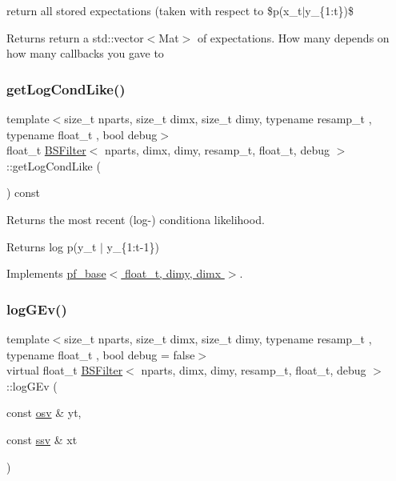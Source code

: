return all stored expectations (taken with respect to \$p(x\+\_\+t$\vert$y\+\_\+\{1\+:t\})\$ 

\begin{DoxyReturn}{Returns}
return a std\+::vector$<$\+Mat$>$ of expectations. How many depends on how many callbacks you gave to 
\end{DoxyReturn}
\mbox{\label{classBSFilter_a9cc91baeaaa2a22bff48d82157c86ec5}} 
\subsubsection{\texorpdfstring{get\+Log\+Cond\+Like()}{getLogCondLike()}}
{\footnotesize\ttfamily template$<$size\+\_\+t nparts, size\+\_\+t dimx, size\+\_\+t dimy, typename resamp\+\_\+t , typename float\+\_\+t , bool debug$>$ \\
float\+\_\+t \hyperlink{classBSFilter}{B\+S\+Filter}$<$ nparts, dimx, dimy, resamp\+\_\+t, float\+\_\+t, debug $>$\+::get\+Log\+Cond\+Like (\begin{DoxyParamCaption}{ }\end{DoxyParamCaption}) const\hspace{0.3cm}{\ttfamily [virtual]}}



Returns the most recent (log-\/) conditiona likelihood. 

\begin{DoxyReturn}{Returns}
log p(y\+\_\+t $\vert$ y\+\_\+\{1\+:t-\/1\}) 
\end{DoxyReturn}


Implements \hyperlink{classpf__base_a350df818820d6ab0fd6d413022b7f23b}{pf\+\_\+base$<$ float\+\_\+t, dimy, dimx $>$}.

\mbox{\label{classBSFilter_a1cf2ed5153756a015384d459e72a57de}} 
\subsubsection{\texorpdfstring{log\+G\+Ev()}{logGEv()}}
{\footnotesize\ttfamily template$<$size\+\_\+t nparts, size\+\_\+t dimx, size\+\_\+t dimy, typename resamp\+\_\+t , typename float\+\_\+t , bool debug = false$>$ \\
virtual float\+\_\+t \hyperlink{classBSFilter}{B\+S\+Filter}$<$ nparts, dimx, dimy, resamp\+\_\+t, float\+\_\+t, debug $>$\+::log\+G\+Ev (\begin{DoxyParamCaption}\item[{const \hyperlink{classBSFilter_a9a4da560f11a6e2d35ffe693de54826b}{osv} \&}]{yt,  }\item[{const \hyperlink{classBSFilter_ad2341b982bcdabc798d7ed0f327d28f7}{ssv} \&}]{xt }\end{DoxyParamCaption})\hspace{0.3cm}{\ttfamily [pure virtual]}}




